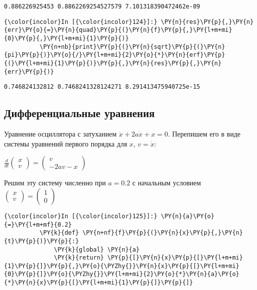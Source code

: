    \begin{Verbatim}[commandchars=\\\{\}]
0.886226925453 0.8862269254527579 7.101318390472462e-09

    \end{Verbatim}

    \begin{Verbatim}[commandchars=\\\{\}]
{\color{incolor}In [{\color{incolor}124}]:} \PY{n}{res}\PY{p}{,}\PY{n}{err}\PY{o}{=}\PY{n}{quad}\PY{p}{(}\PY{n}{f}\PY{p}{,}\PY{l+m+mi}{0}\PY{p}{,}\PY{l+m+mi}{1}\PY{p}{)}
          \PY{n+nb}{print}\PY{p}{(}\PY{n}{sqrt}\PY{p}{(}\PY{n}{pi}\PY{p}{)}\PY{o}{/}\PY{l+m+mi}{2}\PY{o}{*}\PY{n}{erf}\PY{p}{(}\PY{l+m+mi}{1}\PY{p}{)}\PY{p}{,}\PY{n}{res}\PY{p}{,}\PY{n}{err}\PY{p}{)}
\end{Verbatim}

    \begin{Verbatim}[commandchars=\\\{\}]
0.746824132812 0.7468241328124271 8.291413475940725e-15

    \end{Verbatim}

\subsection{Дифференциальные уравнения}
\label{numpy7}

    Уравнение осциллятора с затуханием \(\ddot{x} + 2 a \dot{x} + x = 0\).
Перепишем его в виде системы уравнений первого порядка для \(x\),
\(v=\dot{x}\):

\(\frac{d}{dt} \begin{pmatrix}x\\v\end{pmatrix} = \begin{pmatrix}v\\-2av-x\end{pmatrix}\)

Решим эту систему численно при \(a=0.2\) с начальным условием
\(\begin{pmatrix}x\\v\end{pmatrix}=\begin{pmatrix}1\\0\end{pmatrix}\)

    \begin{Verbatim}[commandchars=\\\{\}]
{\color{incolor}In [{\color{incolor}125}]:} \PY{n}{a}\PY{o}{=}\PY{l+m+mf}{0.2}
          \PY{k}{def} \PY{n+nf}{f}\PY{p}{(}\PY{n}{x}\PY{p}{,}\PY{n}{t}\PY{p}{)}\PY{p}{:}
              \PY{k}{global} \PY{n}{a}
              \PY{k}{return} \PY{p}{[}\PY{n}{x}\PY{p}{[}\PY{l+m+mi}{1}\PY{p}{]}\PY{p}{,}\PY{o}{\PYZhy{}}\PY{n}{x}\PY{p}{[}\PY{l+m+mi}{0}\PY{p}{]}\PY{o}{\PYZhy{}}\PY{l+m+mi}{2}\PY{o}{*}\PY{n}{a}\PY{o}{*}\PY{n}{x}\PY{p}{[}\PY{l+m+mi}{1}\PY{p}{]}\PY{p}{]}
\end{Verbatim}

